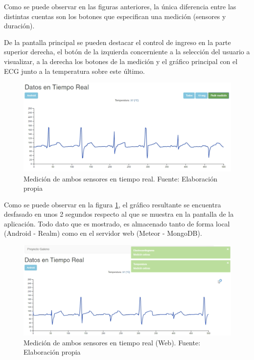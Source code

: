 Como se puede observar en las figuras anteriores, la única diferencia entre las distintas cuentas son los botones que especifican una medición (sensores y duración).

De la pantalla principal se pueden destacar el control de ingreso en la parte superior derecha, el botón de la izquierda concerniente a la selección del usuario a visualizar, a la derecha los botones de la medición y el gráfico principal con el ECG junto a la temperatura sobre este último.

\begin{figure}[H]
	\centering
	\includegraphics[scale=0.4]{figuras/protof/medicion.png}
	\caption{Medición de ambos sensores en tiempo real. Fuente: Elaboración propia}
	\label{medicion}
\end{figure}

Como se puede observar en la figura \ref{medicion}, el gráfico resultante se encuentra desfasado en unos 2 segundos respecto al que se muestra en la pantalla de la aplicación. Todo dato que es mostrado, es almacenado tanto de forma local (Android - Realm) como en el servidor web (Meteor - MongoDB).

\begin{figure}[H]
	\centering
	\includegraphics[scale=0.4]{figuras/protof/medicionPc.png}
	\caption{Medición de ambos sensores en tiempo real (Web). Fuente: Elaboración propia}
	\label{medicionPc}
\end{figure}


